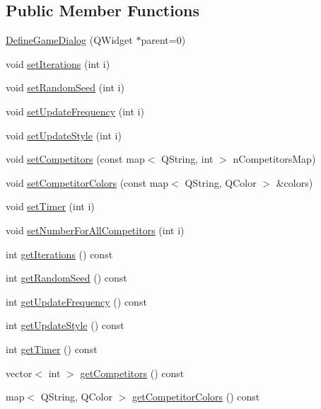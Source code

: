 \subsection*{Public Member Functions}
\begin{DoxyCompactItemize}
\item 
\hyperlink{class_define_game_dialog_aafaecddd54e13a28a0ca272bdc083846}{DefineGameDialog} (QWidget $\ast$parent=0)
\item 
void \hyperlink{class_define_game_dialog_a33728191a5e1eeb299231366a34a7755}{setIterations} (int i)
\item 
void \hyperlink{class_define_game_dialog_ae25df866135fe7bf0b0fbeb07e0afce8}{setRandomSeed} (int i)
\item 
void \hyperlink{class_define_game_dialog_ac3c15aa4373e80a2d1f48e351fbec22d}{setUpdateFrequency} (int i)
\item 
void \hyperlink{class_define_game_dialog_a1f8fb573eed31f5ca51bab1fc95dfd96}{setUpdateStyle} (int i)
\item 
void \hyperlink{class_define_game_dialog_ae69dba8751b7d1c7a9a37dc93194c940}{setCompetitors} (const map$<$ QString, int $>$ nCompetitorsMap)
\item 
void \hyperlink{class_define_game_dialog_af620552efe0e2745c0597f86b27faa54}{setCompetitorColors} (const map$<$ QString, QColor $>$ \&colors)
\item 
void \hyperlink{class_define_game_dialog_ab87cb307a2e7df3db01f011d4ec521f6}{setTimer} (int i)
\item 
void \hyperlink{class_define_game_dialog_a744104a9111b8162e8caf0b7407e6a9b}{setNumberForAllCompetitors} (int i)
\item 
int \hyperlink{class_define_game_dialog_aab8b573f7013cfc7517604f821846811}{getIterations} () const 
\item 
int \hyperlink{class_define_game_dialog_a92f8df459fdfe50d4970bc720cc49df5}{getRandomSeed} () const 
\item 
int \hyperlink{class_define_game_dialog_a7aa948035e602f797fb12cfcf35f1887}{getUpdateFrequency} () const 
\item 
int \hyperlink{class_define_game_dialog_ac876a8f37fcbb32d35fc7f5811709acd}{getUpdateStyle} () const 
\item 
int \hyperlink{class_define_game_dialog_a961536538a0eb16d9c309b1344b5da14}{getTimer} () const 
\item 
vector$<$ int $>$ \hyperlink{class_define_game_dialog_a01961f0e810461d5d133d9b1414e23ab}{getCompetitors} () const 
\item 
map$<$ QString, QColor $>$ \hyperlink{class_define_game_dialog_ae5997315e5d87ff38f075d810575eafe}{getCompetitorColors} () const 
\end{DoxyCompactItemize}


